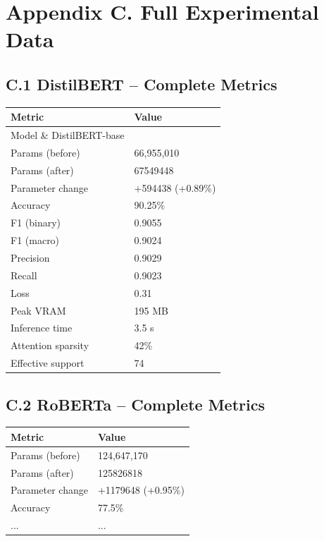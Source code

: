 
\section{Appendix C. Full Experimental Data}

\subsection{C.1 DistilBERT -- Complete Metrics}

\begin{table}[H]
\centering
\small
\begin{tabular}{ll}
\toprule
\textbf{Metric} & \textbf{Value} \\
\midrule
Model \& DistilBERT-base \\
Params (before) & 66,955,010 \\
Params (after) & 67549448 \\
Parameter change & +594438 (+0.89\%) \\
Accuracy & 90.25\% \\
F1 (binary) & 0.9055 \\
F1 (macro) & 0.9024 \\
Precision & 0.9029 \\
Recall & 0.9023 \\
Loss & 0.31 \\
Peak VRAM & 195 MB \\
Inference time & 3.5 s \\
Attention sparsity & 42\% \\
Effective support & 74 \\
\bottomrule
\end{tabular}
\end{table}

\subsection{C.2 RoBERTa -- Complete Metrics}

\begin{table}[H]
\centering
\small
\begin{tabular}{ll}
\toprule
\textbf{Metric} & \textbf{Value} \\
\midrule
Params (before) & 124,647,170 \\
Params (after) & 125826818 \\
Parameter change & +1179648 (+0.95\%) \\
Accuracy & 77.5\% \\
... & ... \\
\bottomrule
\end{tabular}
\end{table}

